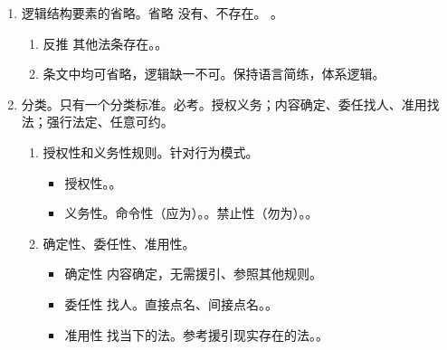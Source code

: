 \begin{enumerate}
\begin{enumerate}
\begin{enumerate}
\begin{enumerate}
                          \item 假定条件 = 适用前提。主体、事项条件。出现/加上如果两字不改变原含义。
                          \item 行为模式 \bdy 裁判模式。表达权利、义务。可为、应为、勿为。判断 \yjt 定身份（一般人）+ 定事。
                          \item 法律后果。\yi 肯定/正面后果（不制裁）。\er 否定/负面后果。
                        \end{enumerate}
                  \item 逻辑结构要素的省略。省略 \bdy 没有、不存在。
                        。
                        \begin{enumerate}
                          \item 反推 \hz 其他法条存在。。
                          \item 条文中均可省略，逻辑缺一不可。保持语言简练，体系逻辑。
                        \end{enumerate}
                  \item 分类。只有一个分类标准。必考。授权义务；内容确定、委任找人、准用找法；强行法定、任意可约。
                        \begin{enumerate}
                          \item 授权性和义务性规则。针对行为模式。
                                \begin{itemize}
                                  \item 授权性。。
                                  \item 义务性。\yi 命令性（应为）。。\er 禁止性（勿为）。。
                                \end{itemize}
                          \item 确定性、委任性、准用性。
                                \begin{itemize}
                                  \item 确定性 \yjt 内容确定，无需援引、参照其他规则。
                                  \item 委任性 \yjt 找人。直接点名、间接点名。。
                                  \item 准用性 \yjt 找当下的法。参考援引现实存在的法。。
                                \end{itemize}

\end{enumerate}
\end{enumerate}
\end{enumerate}
\end{enumerate}
